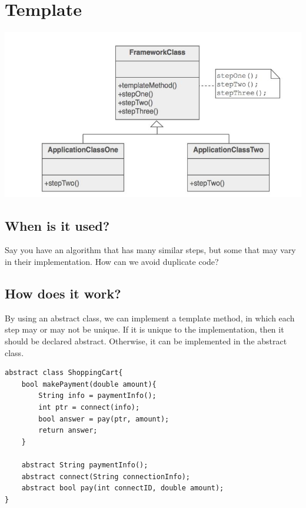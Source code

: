 \documentclass[12pt]{article}
\theoremstyle{definition}
\begin{document}
\section{Template}
\includegraphics{template}
\subsection{When is it used?}
Say you have an algorithm that has many similar steps, but some that may vary in their implementation. How can we avoid duplicate code? 
\\ \linebreak

\subsection{How does it work?}
By using an abstract class, we can implement a template method, in which each step may or may not be unique. If it is unique to the implementation, then it should be declared abstract. Otherwise, it can be implemented in the abstract class.
\\ \linebreak
\begin{lstlisting}
abstract class ShoppingCart{
	bool makePayment(double amount){
		String info = paymentInfo();
		int ptr = connect(info);
		bool answer = pay(ptr, amount);
		return answer;
	}
	
	abstract String paymentInfo();
	abstract connect(String connectionInfo);
	abstract bool pay(int connectID, double amount);
}

\end{lstlisting}
\end{document}
